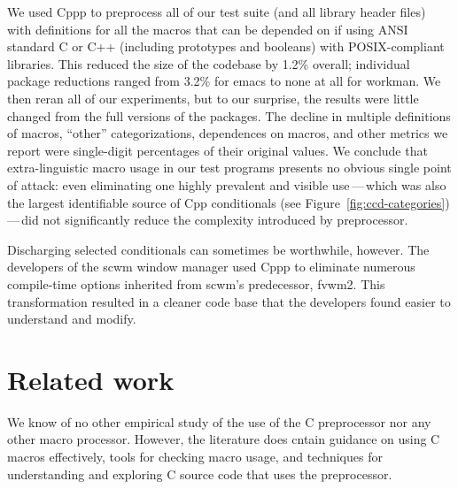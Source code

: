\documentclass[10pt]{article}
\newcommand{\comment}[1]{\textbf{[[#1]]}}
\newcommand{\pkg}[1]{\textsf{#1}}
\begin{document}



We used Cppp to preprocess all of our test suite (and all library header
files) with definitions for all the macros that can be depended on if using
ANSI standard C or C++ (including prototypes and booleans) with
POSIX-compliant libraries.  This reduced the size of the codebase by 1.2\%
overall; individual package reductions ranged from 3.2\% for \pkg{emacs} to
none at all for \pkg{workman}.  We then reran all of our experiments, but
to our surprise, the results were little changed from the full versions of
the packages.  The decline in multiple definitions of macros, ``other''
categorizations, dependences on macros, and other metrics we report were
single-digit percentages of their original values.  We conclude that
extra-linguistic macro usage in our test programs presents no obvious
single point of attack:  even eliminating one highly prevalent and visible
use\,---\,which was also the largest identifiable source of Cpp
conditionals (see Figure~\ref{fig:ccd-categories})\,---\,did not
significantly reduce the complexity introduced by preprocessor.

Discharging selected conditionals can sometimes be worthwhile, however.
The developers of the \pkg{scwm} window manager used Cppp to eliminate
numerous compile-time options inherited from \pkg{scwm}'s predecessor,
\pkg{fvwm2}.  This transformation resulted in a cleaner code base that the
developers found easier to understand and modify.



\section{Related work}
\label{sec:related}

We know of no other empirical study of the use of the C preprocessor nor
any other macro processor.  However, the literature does cntain guidance on
using C macros effectively, tools for checking macro usage, and techniques
for understanding and exploring C source code that uses the preprocessor.
\end{document}
